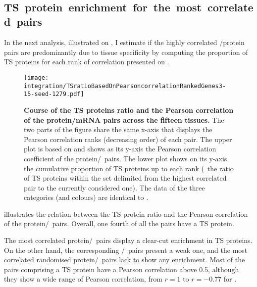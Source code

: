 \FloatBarrier\

\subsection{TS~protein~enrichment~for~the~most~correlated~pairs}
\vspace{-7mm}
In the next analysis, illustrated on ,
I estimate if the highly correlated \mRNA/protein pairs
are predominantly due to tissue specificity
by computing the proportion of \gls{TS} proteins
for each rank of correlation presented on .

\begin{figure}[!ht]
    \texttt{[image: integration/TSratioBasedOnPearsoncorrelationRankedGenes3-15-seed-1279.pdf]}\centering
    \vspace{-3mm}
    \caption[Course of the TS proteins ratio and the Pearson correlation
    of protein/mRNA pairs]{\label{fig:Spe_Cor}%
    \textbf{Course of the TS proteins ratio and the Pearson correlation
    of the protein/mRNA pairs across the fifteen tissues.}
    The two parts of the figure share the same x-axis
    that displays the Pearson correlation ranks (decreasing order) of each pair.
    The upper plot is based on 
    and shows as its y-axis the Pearson correlation coefficient
    of the protein/\mRNA\ pairs.
    The lower plot shows on its y-axis
    the cumulative proportion of \gls{TS} proteins up to each rank
    (\ie\ the ratio of \gls{TS} proteins
    within the set delimited from the highest correlated pair
    to the currently considered one).
    The data of the three categories (and colours)
    are identical to .}
\end{figure}

\vspace{-1mm}
 illustrates the relation between the \gls{TS} protein ratio
and the Pearson correlation of the protein/\mRNA\ pairs.
Overall, one fourth of all the pairs have a \gls{TS} protein.

The most correlated protein/\mRNA\ pairs display
a clear-cut enrichment in \gls{TS} proteins.
On the other hand, the corresponding \mRNA/\mRNA\ pairs present a weak one,
and the most correlated randomised protein/\mRNA\ pairs
lack to show any enrichment.
Most of the pairs comprising a \gls{TS} protein have
a Pearson correlation above 0.5,
although they show a wide range of Pearson correlation,
from $r=1$ to $r= -0.77$ for .\\
\vspace{-\baselineskip}

